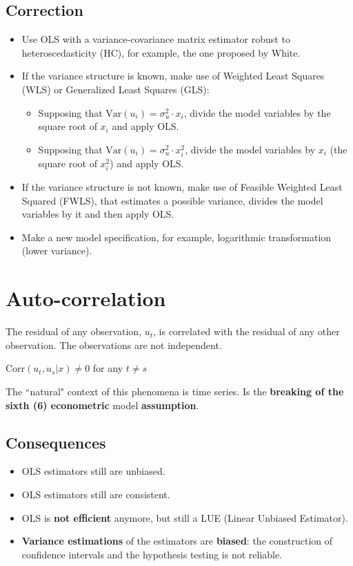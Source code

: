 \documentclass[10pt, a4paper, landscape]{extarticle}
\newcommand{\Var}{\mathrm{Var}}
\newcommand{\Corr}{\mathrm{Corr}}
\begin{document}
\begin{multicols}{3}
	\subsection*{Correction}
		\begin{itemize}[leftmargin=*]
			\item Use OLS with a variance-covariance matrix estimator robust to heteroscedasticity (HC), for example, the one proposed by White.
			\item If the variance structure is known, make use of Weighted Least Squares (WLS) or Generalized Least Squares (GLS):
			\begin{itemize}[leftmargin=*]
				\item Supposing that $\Var(u_i) = \sigma^2_u \cdot x_i$, divide the model variables by the square root of $x_i$ and apply OLS.
				\item Supposing that $\Var(u_i) = \sigma^2_u \cdot x_i^2$, divide the model variables by $x_i$ (the square root of $x_i^2$) and apply OLS.
			\end{itemize}
			\item If the variance structure is not known, make use of Feasible Weighted Least Squared (FWLS), that estimates a possible variance, divides the model variables by it and then apply OLS.
			\item Make a new model specification, for example, logarithmic transformation (lower variance).
		\end{itemize}
\columnbreak
\section*{Auto-correlation}
	The residual of any observation, $u_t$, is correlated with the residual of any other observation. The observations are not independent.
	\begin{center}
		$\Corr(u_t, u_s | x) \neq 0$ for any $t \neq s$
	\end{center}
	The ``natural" context of this phenomena is time series. Is the \textbf{breaking of the sixth (6) econometric} model \textbf{assumption}.
	\subsection*{Consequences}
		\begin{itemize}[leftmargin=*]
			\item OLS estimators still are unbiased.
			\item OLS estimators still are consistent.
			\item OLS is \textbf{not efficient} anymore, but still a LUE (Linear Unbiased Estimator).
			\item \textbf{Variance estimations} of the estimators are \textbf{biased}: the construction of confidence intervals and the hypothesis testing is not reliable.
		\end{itemize}

\end{multicols}
\end{document}
